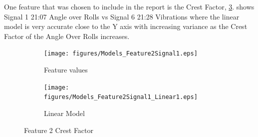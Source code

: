 \documentclass[]{article}
\begin{document}
One feature that was chosen to include in the report is the Crest Factor, \cref{fig:Models_Feature2Signal1_Caption}.  shows Signal 1 21:07 Angle over Rolls vs Signal 6 21:28 Vibrations where the linear model is very accurate close to the Y axis with increasing variance as the Crest Factor of the Angle Over Rolls increases.

\begin{figure}[H]
    \centering
		\begin{subfigure}{.5\textwidth}
		  \centering
    			\texttt{[image: figures/Models\_Feature2Signal1.eps]}
		  	\caption{Feature values}
		  	\label{fig:Models_Feature2Signal9}
		\end{subfigure}%
		\begin{subfigure}{.5\textwidth}
		  \centering
 		   	\texttt{[image: figures/Models\_Feature2Signal1\_Linear1.eps]}
		  	\caption{Linear Model}
		  	\label{fig:Models_Feature2Signal1_Linear1}
		\end{subfigure}
    \caption{Feature 2 Crest Factor}
    \label{fig:Models_Feature2Signal1_Caption}
\end{figure}
\end{document}
